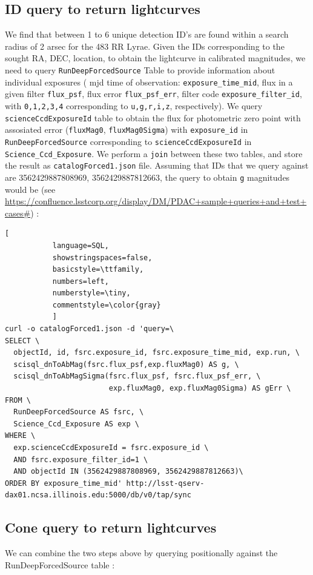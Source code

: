 \documentclass[fleqn,usenatbib]{mnras} %
\begin{document}
\subsection{ID query to return lightcurves}
We find that between 1 to 6 unique detection ID's are found within a search radius of 2 arsec for the 483 RR Lyrae.  Given the IDs corresponding to the sought RA, DEC, location, to obtain the lightcurve in calibrated magnitudes, we need to query \verb|RunDeepForcedSource| Table to provide information about individual exposures ( mjd time of observation: \verb|exposure_time_mid|, flux in a given filter \verb|flux_psf|, flux error \verb|flux_psf_err|, filter code \verb|exposure_filter_id|, with  \verb|0,1,2,3,4| corresponding to  \verb|u,g,r,i,z|, respectively).  We query \verb|scienceCcdExposureId| table to obtain the flux for photometric zero point with assosiated error (\verb|fluxMag0|, \verb|fluxMag0Sigma|)  with  \verb|exposure_id| in \verb|RunDeepForcedSource| corresponding to \verb|scienceCcdExposureId| in \verb|Science_Ccd_Exposure|. We perform a \verb|join| between these two tables, and store the result as   \verb|catalogForced1.json| file. 
Assuming that IDs that we query against are 3562429887808969, 3562429887812663, the query to obtain \verb|g| magnitudes would be (see  \url{https://confluence.lsstcorp.org/display/DM/PDAC+sample+queries+and+test+cases#}) :


\begin{lstlisting}[
           language=SQL,
           showstringspaces=false,
           basicstyle=\ttfamily,
           numbers=left,
           numberstyle=\tiny,
           commentstyle=\color{gray}
           ]
curl -o catalogForced1.json -d 'query=\
SELECT \
  objectId, id, fsrc.exposure_id, fsrc.exposure_time_mid, exp.run, \
  scisql_dnToAbMag(fsrc.flux_psf,exp.fluxMag0) AS g, \
  scisql_dnToAbMagSigma(fsrc.flux_psf, fsrc.flux_psf_err, \
                        exp.fluxMag0, exp.fluxMag0Sigma) AS gErr \
FROM \
  RunDeepForcedSource AS fsrc, \
  Science_Ccd_Exposure AS exp \
WHERE \
  exp.scienceCcdExposureId = fsrc.exposure_id \
  AND fsrc.exposure_filter_id=1 \
  AND objectId IN (3562429887808969, 3562429887812663)\
ORDER BY exposure_time_mid' http://lsst-qserv-dax01.ncsa.illinois.edu:5000/db/v0/tap/sync

\end{lstlisting}

\subsection{Cone query to return lightcurves}
We can combine the two steps above by querying positionally against the RunDeepForcedSource table : 
\end{document}

